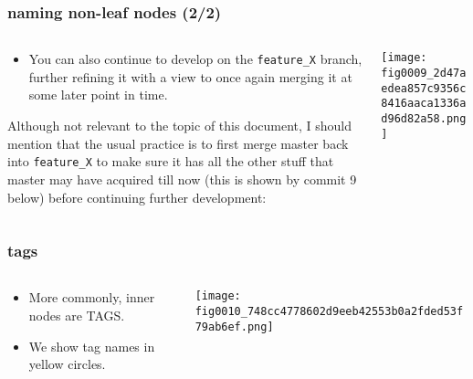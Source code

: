 \documentclass[presentation]{beamer}
\begin{document}
\begin{frame}
\frametitle{naming non-leaf nodes (2/2)}
\label{sec-3-8}
\begin{columns}
\begin{column}{0.6\textwidth}
\label{sec-3-8-1}


\begin{itemize}
\item You can also continue to develop on the \texttt{feature\_X} branch, further refining
  it with a view to once again merging it at some later point in time.
\end{itemize}

\tiny
Although not relevant to the topic of this document, I should
mention that the usual practice is to first merge master back into \texttt{feature\_X}
to make sure it has all the other stuff that master may have acquired till
now (this is shown by commit 9 below) before continuing further
development:
\end{column}
\begin{column}{0.4\textwidth}
\label{sec-3-8-2}


\texttt{[image: fig0009\_2d47aedea857c9356c8416aaca1336ad96d82a58.png]}
\end{column}
\end{columns}
\end{frame}
\begin{frame}
\frametitle{tags}
\label{sec-3-9}
\begin{columns}
\begin{column}{0.6\textwidth}
\label{sec-3-9-1}


\begin{itemize}
\item More commonly, inner nodes are TAGS.
\item We show tag names in yellow circles.
\end{itemize}
\end{column}
\begin{column}{0.4\textwidth}
\label{sec-3-9-2}


\texttt{[image: fig0010\_748cc4778602d9eeb42553b0a2fded53f79ab6ef.png]}
\end{column}
\end{columns}
\end{frame}
\end{document}
